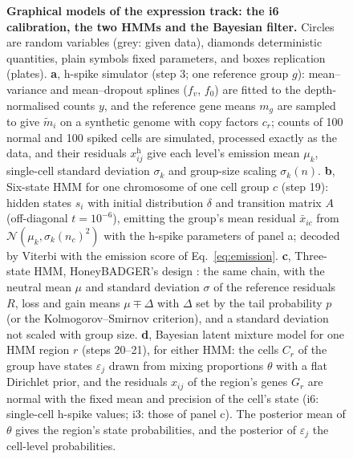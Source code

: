 {\begin{figure}[p]
\caption{\textbf{Graphical models of the expression track: the i6 calibration, the two HMMs and the Bayesian filter.} Circles are random variables (grey: given data), diamonds deterministic quantities, plain symbols fixed parameters, and boxes replication (plates). \textbf{a}, h-spike simulator (step 3; one reference group $g$): mean--variance and mean--dropout splines ($f_v$, $f_0$) are fitted to the depth-normalised counts $y$, and the reference gene means $m_g$ are sampled to give $\tilde m_i$ on a synthetic genome with copy factors $c_r$; counts of 100 normal and 100 spiked cells are simulated, processed exactly as the data, and their residuals $x^{\mathrm h}_{ij}$ give each level's emission mean $\mu_k$, single-cell standard deviation $\sigma_k$ and group-size scaling $\sigma_k(n)$. \textbf{b}, Six-state HMM for one chromosome of one cell group $c$ (step 19): hidden states $s_i$ with initial distribution $\delta$ and transition matrix $A$ (off-diagonal $t=10^{-6}$), emitting the group's mean residual $\bar x_{ic}$ from $\mathcal N(\mu_k,\sigma_k(n_c)^2)$ with the h-spike parameters of panel a; decoded by Viterbi with the emission score of Eq.~\ref{eq:emission}. \textbf{c}, Three-state HMM, HoneyBADGER's design \citep{fan2018}: the same chain, with the neutral mean $\mu$ and standard deviation $\sigma$ of the reference residuals $R$, loss and gain means $\mu\mp\Delta$ with $\Delta$ set by the tail probability $p$ (or the Kolmogorov--Smirnov criterion), and a standard deviation not scaled with group size. \textbf{d}, Bayesian latent mixture model for one HMM region $r$ (steps 20--21), for either HMM: the cells $C_r$ of the group have states $\varepsilon_j$ drawn from mixing proportions $\theta$ with a flat Dirichlet prior, and the residuals $x_{ij}$ of the region's genes $G_r$ are normal with the fixed mean and precision of the cell's state (i6: single-cell h-spike values; i3: those of panel c). The posterior mean of $\theta$ gives the region's state probabilities, and the posterior of $\varepsilon_j$ the cell-level probabilities.}
\label{fig:Smodels}
\end{figure}}


